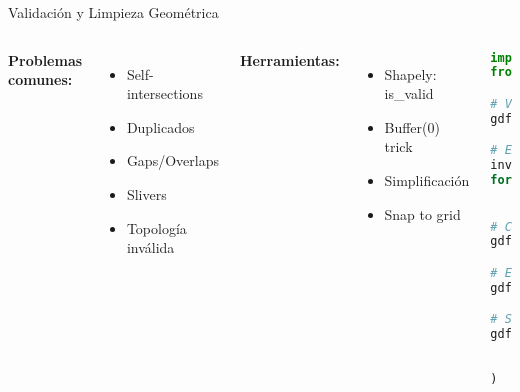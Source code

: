 \documentclass[10pt]{beamer}
\begin{document}
\begin{frame}[fragile]{Validación y Limpieza Geométrica}
    \begin{columns}
        \textbf{Problemas comunes:}
        \begin{itemize}
            \item Self-intersections
            \item Duplicados
            \item Gaps/Overlaps
            \item Slivers
            \item Topología inválida
        \end{itemize}
        
        \textbf{Herramientas:}
        \begin{itemize}
            \item Shapely: is\_valid
            \item Buffer(0) trick
            \item Simplificación
            \item Snap to grid
        \end{itemize}
        
        \begin{lstlisting}[language=Python, caption=Validación y corrección]
import geopandas as gpd
from shapely.validation import explain_validity

# Verificar validez
gdf['valido'] = gdf.geometry.is_valid

# Explicar problemas
invalidos = gdf[~gdf['valido']]
for idx, row in invalidos.iterrows():
    print(explain_validity(row.geometry))

# Corregir con buffer(0)
gdf['geometry'] = gdf.geometry.buffer(0)

# Eliminar slivers
gdf = gdf[gdf.geometry.area > 0.001]

# Simplificar
gdf['geometry'] = gdf.geometry.simplify(
    tolerance=1.0, 
    preserve_topology=True
)
        \end{lstlisting}
    \end{columns}
\end{frame}
\end{document}
